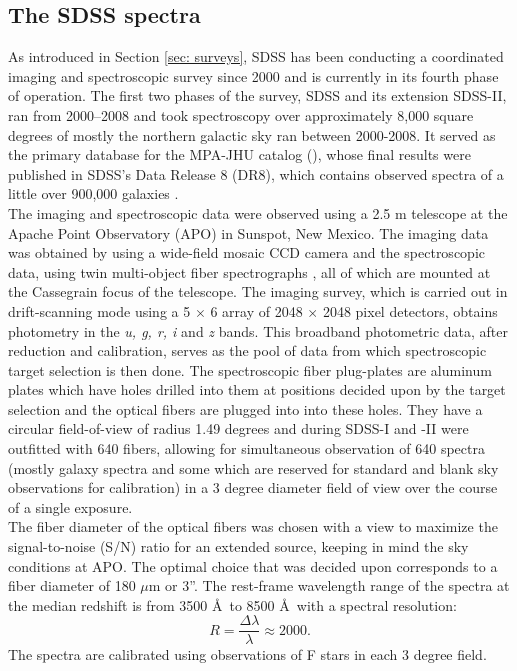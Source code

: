 \subsection{The SDSS spectra}
\label{sdss spectra}

As introduced in Section \ref{sec: surveys}, SDSS has been conducting a coordinated imaging and spectroscopic survey since 2000 and is currently in its fourth phase of operation. The first two phases of the survey, SDSS and its extension SDSS-II, ran from 2000--2008 and took spectroscopy over approximately 8,000 square degrees of mostly the northern galactic sky 
ran between 2000-2008. It served as the primary database for the MPA-JHU catalog (\citealt{brinchmann_physical_2004, kauffmann_stellar_2003, tremonti_origin_2004}), whose final results were published in SDSS's Data Release 8 (DR8), 
which contains observed spectra of a little over 900,000 galaxies \citep{aihara11a}.\\

The imaging and spectroscopic data were observed using a 2.5 m telescope at the Apache Point Observatory (APO) in Sunspot, New Mexico. The imaging data was obtained by using a wide-field mosaic CCD camera and the spectroscopic data, using twin multi-object fiber spectrographs  \citep{smee_multi-object_2013}, all of which are mounted at the Cassegrain focus of the telescope. The imaging survey, which is carried out in drift-scanning mode using a 5 $\times$ 6 array of 2048 $\times$ 2048 pixel detectors, obtains photometry in the \emph{u, g, r, i} and \emph{z} bands. This broadband photometric data, after reduction and calibration, serves as the pool of data from which spectroscopic target selection is then done. The spectroscopic fiber plug-plates are aluminum plates which have holes drilled into them at positions decided upon by the target selection and the optical fibers are plugged into into these holes. They have a circular field-of-view of radius 1.49 degrees and during SDSS-I and -II were outfitted with 640 fibers, allowing for simultaneous observation of 640 spectra (mostly galaxy spectra and some which are reserved for standard and blank sky observations for calibration) in a 3 degree diameter field of view over the course of a single exposure.\\

The fiber diameter of the optical fibers was chosen with a view to maximize the signal-to-noise (S/N) ratio for an extended source, keeping in mind the sky conditions at APO. The optimal choice that was decided upon corresponds to a fiber diameter of 180 $\mu$m or 3''. The rest-frame wavelength range of the spectra at the median redshift is from 3500 \AA\ to 8500 \AA\ with a spectral resolution:\\ $$R = \frac{\Delta \lambda}{\lambda} \approx 2000.$$ The spectra are calibrated using observations of F stars in each 3 degree field.\\

